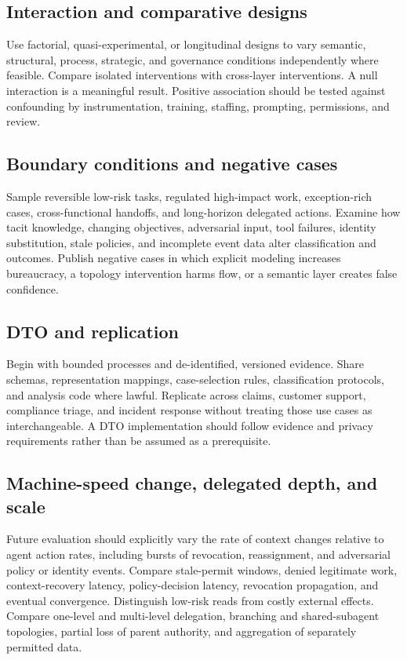 \documentclass[11pt,letterpaper]{article}
\begin{document}
\subsection{Interaction and comparative designs}
Use factorial, quasi-experimental, or longitudinal designs to vary semantic, structural, process, strategic, and governance conditions independently where feasible. Compare isolated interventions with cross-layer interventions. A null interaction is a meaningful result. Positive association should be tested against confounding by instrumentation, training, staffing, prompting, permissions, and review.

\subsection{Boundary conditions and negative cases}
Sample reversible low-risk tasks, regulated high-impact work, exception-rich cases, cross-functional handoffs, and long-horizon delegated actions. Examine how tacit knowledge, changing objectives, adversarial input, tool failures, identity substitution, stale policies, and incomplete event data alter classification and outcomes. Publish negative cases in which explicit modeling increases bureaucracy, a topology intervention harms flow, or a semantic layer creates false confidence.

\subsection{DTO and replication}
Begin with bounded processes and de-identified, versioned evidence. Share schemas, representation mappings, case-selection rules, classification protocols, and analysis code where lawful. Replicate across claims, customer support, compliance triage, and incident response without treating those use cases as interchangeable. A DTO implementation should follow evidence and privacy requirements rather than be assumed as a prerequisite.

\subsection{Machine-speed change, delegated depth, and scale}
Future evaluation should explicitly vary the rate of context changes relative to agent action rates, including bursts of revocation, reassignment, and adversarial policy or identity events. Compare stale-permit windows, denied legitimate work, context-recovery latency, policy-decision latency, revocation propagation, and eventual convergence. Distinguish low-risk reads from costly external effects. Compare one-level and multi-level delegation, branching and shared-subagent topologies, partial loss of parent authority, and aggregation of separately permitted data.
\end{document}
